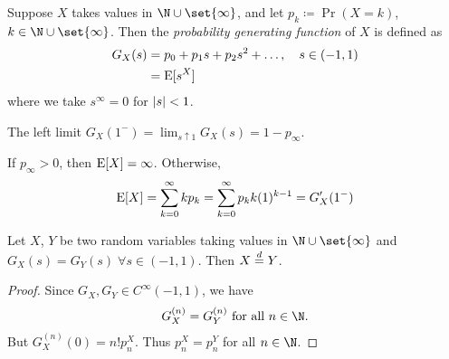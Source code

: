 \begin{definition*} \label{def:pgf}
    Suppose $X$ takes values in $\N \cup \set{\infty}$, and let
    $p_k \coloneq \Pr(X = k)$, $k \in \N \cup \set{\infty}$.
    Then the \emph{probability generating function} of $X$ is defined as
    \begin{align*}
        G_X(s) &= p_0 + p_1 s + p_2 s^2 + \dots, \quad s \in (-1, 1) \\
            &= \operatorname{\mathrm{E}}[s^X]
    \end{align*} where we take $s^\infty = 0$ for $\abs{s} < 1$.
\end{definition*}
\begin{remark}
    The left limit $G_X(1^-) = \lim_{s \uparrow 1} G_X(s) = 1 - p_\infty$.
\end{remark}
If $p_\infty > 0$, then $\operatorname{\mathrm{E}}[X] = \infty$.
Otherwise, \[
    \operatorname{\mathrm{E}}[X] = \sum_{k=0}^{\infty} k p_k
          = \sum_{k=0}^{\infty} p_k k (1)^{k-1}
          = G_X'(1^-)
\]

\begin{theorem*} \label{thm:pgf}
    Let $X$, $Y$ be two random variables taking values in
    $\N \cup \set{\infty}$ and $G_X(s) = G_Y(s) \;\forall s \in (-1, 1)$.
    Then $X \overset{d}{=} Y$.
\end{theorem*}
\begin{proof}
    Since $G_X, G_Y \in C^\infty(-1, 1)$, we have \[
        G_X^{(n)} = G_Y^{(n)} \text{ for all } n \in \N.
    \] But $G_X^{(n)}(0) = n! p_n^X$.
    Thus $p_n^X = p_n^Y$ for all $n \in \N$.
\end{proof}

